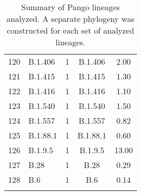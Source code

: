 \begin{longtable}{lp{4cm}ccc}
  120 & B.1.406 &   1 & B.1.406 & 2.00 \\ 
  121 & B.1.415 &   1 & B.1.415 & 1.30 \\ 
  122 & B.1.416 &   1 & B.1.416 & 1.10 \\ 
  123 & B.1.540 &   1 & B.1.540 & 1.50 \\ 
  124 & B.1.557 &   1 & B.1.557 & 0.82 \\ 
  125 & B.1.88.1 &   1 & B.1.88.1 & 0.60 \\ 
  126 & B.1.9.5 &   1 & B.1.9.5 & 13.00 \\ 
  127 & B.28 &   1 & B.28 & 0.29 \\ 
  128 & B.6 &   1 & B.6 & 0.14 \\ 
   \hline
\hline
\caption{Summary of Pango lineages analyzed. A separate phylogeny was constructed for each set of analyzed lineages.} 
\label{tab:lineage-data-summary}
\end{longtable}
